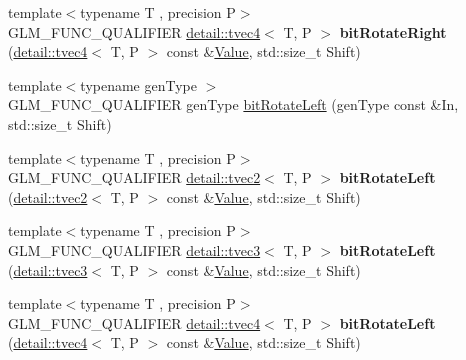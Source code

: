 \begin{DoxyCompactItemize}
\item 
{\footnotesize template$<$typename T , precision P$>$ }\\G\+L\+M\+\_\+\+F\+U\+N\+C\+\_\+\+Q\+U\+A\+L\+I\+F\+I\+ER \hyperlink{structglm_1_1detail_1_1tvec4}{detail\+::tvec4}$<$ T, P $>$ {\bfseries bit\+Rotate\+Right} (\hyperlink{structglm_1_1detail_1_1tvec4}{detail\+::tvec4}$<$ T, P $>$ const \&\hyperlink{document_8h_a071cf97155ba72ac9a1fc4ad7e63d481}{Value}, std\+::size\+\_\+t Shift)\hypertarget{namespaceglm_a06a3b8df080a9a4b7dd1148134ade32a}{}\label{namespaceglm_a06a3b8df080a9a4b7dd1148134ade32a}

\item 
{\footnotesize template$<$typename gen\+Type $>$ }\\G\+L\+M\+\_\+\+F\+U\+N\+C\+\_\+\+Q\+U\+A\+L\+I\+F\+I\+ER gen\+Type \hyperlink{group__gtx__bit_ga32c0a5149152a9aa75afafe81b19be53}{bit\+Rotate\+Left} (gen\+Type const \&In, std\+::size\+\_\+t Shift)
\item 
{\footnotesize template$<$typename T , precision P$>$ }\\G\+L\+M\+\_\+\+F\+U\+N\+C\+\_\+\+Q\+U\+A\+L\+I\+F\+I\+ER \hyperlink{structglm_1_1detail_1_1tvec2}{detail\+::tvec2}$<$ T, P $>$ {\bfseries bit\+Rotate\+Left} (\hyperlink{structglm_1_1detail_1_1tvec2}{detail\+::tvec2}$<$ T, P $>$ const \&\hyperlink{document_8h_a071cf97155ba72ac9a1fc4ad7e63d481}{Value}, std\+::size\+\_\+t Shift)\hypertarget{namespaceglm_a1f2d95e740a8909b8b5d760722f04954}{}\label{namespaceglm_a1f2d95e740a8909b8b5d760722f04954}

\item 
{\footnotesize template$<$typename T , precision P$>$ }\\G\+L\+M\+\_\+\+F\+U\+N\+C\+\_\+\+Q\+U\+A\+L\+I\+F\+I\+ER \hyperlink{structglm_1_1detail_1_1tvec3}{detail\+::tvec3}$<$ T, P $>$ {\bfseries bit\+Rotate\+Left} (\hyperlink{structglm_1_1detail_1_1tvec3}{detail\+::tvec3}$<$ T, P $>$ const \&\hyperlink{document_8h_a071cf97155ba72ac9a1fc4ad7e63d481}{Value}, std\+::size\+\_\+t Shift)\hypertarget{namespaceglm_afd830a73912ea4ec771a5d9bd09c3cd4}{}\label{namespaceglm_afd830a73912ea4ec771a5d9bd09c3cd4}

\item 
{\footnotesize template$<$typename T , precision P$>$ }\\G\+L\+M\+\_\+\+F\+U\+N\+C\+\_\+\+Q\+U\+A\+L\+I\+F\+I\+ER \hyperlink{structglm_1_1detail_1_1tvec4}{detail\+::tvec4}$<$ T, P $>$ {\bfseries bit\+Rotate\+Left} (\hyperlink{structglm_1_1detail_1_1tvec4}{detail\+::tvec4}$<$ T, P $>$ const \&\hyperlink{document_8h_a071cf97155ba72ac9a1fc4ad7e63d481}{Value}, std\+::size\+\_\+t Shift)\hypertarget{namespaceglm_a45a6d5d1c93e455dfdfc8fee6567ab92}{}\label{namespaceglm_a45a6d5d1c93e455dfdfc8fee6567ab92}


\end{DoxyCompactItemize}
